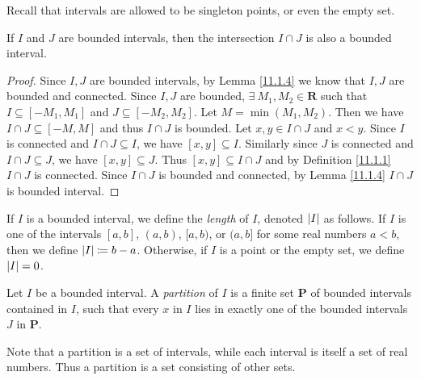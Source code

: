 \begin{remark}\label{11.1.5}
    Recall that intervals are allowed to be singleton points, or even the empty set.
\end{remark}

\begin{corollary}\label{11.1.6}
    If \(I\) and \(J\) are bounded intervals, then the intersection \(I \cap J\) is also a bounded interval.
\end{corollary}

\begin{proof}
    Since \(I, J\) are bounded intervals, by Lemma \ref{11.1.4} we know that \(I, J\) are bounded and connected.
    Since \(I, J\) are bounded, \(\exists\ M_1, M_2 \in \mathbf{R}\) such that \(I \subseteq [-M_1, M_1]\) and \(J \subseteq [-M_2, M_2]\).
    Let \(M = \min(M_1, M_2)\).
    Then we have \(I \cap J \subseteq [-M, M]\) and thus \(I \cap J\) is bounded.
    Let \(x, y \in I \cap J\) and \(x < y\).
    Since \(I\) is connected and \(I \cap J \subseteq I\), we have \([x, y] \subseteq I\).
    Similarly since \(J\) is connected and \(I \cap J \subseteq J\), we have \([x, y] \subseteq J\).
    Thus \([x, y] \subseteq I \cap J\) and by Definition \ref{11.1.1} \(I \cap J\) is connected.
    Since \(I \cap J\) is bounded and connected, by Lemma \ref{11.1.4} \(I \cap J\) is bounded interval.
\end{proof}

\setcounter{theorem}{7}
\begin{definition}\label{11.1.8}
    If \(I\) is a bounded interval, we define the \emph{length} of \(I\), denoted \(\abs*{I}\) as follows.
    If \(I\) is one of the intervals \([a, b]\), \((a, b)\), \([a, b)\), or \((a, b]\) for some real numbers \(a < b\), then we define \(\abs*{I} \coloneqq b - a\).
    Otherwise, if \(I\) is a point or the empty set, we define \(\abs*{I} = 0\).
\end{definition}

\setcounter{theorem}{9}
\begin{definition}[Partitions]\label{11.1.10}
    Let \(I\) be a bounded interval.
    A \emph{partition} of \(I\) is a finite set \(\mathbf{P}\) of bounded intervals contained in \(I\), such that every \(x\) in \(I\) lies in exactly one of the bounded intervals \(J\) in \(\mathbf{P}\).
\end{definition}

\begin{remark}\label{11.1.11}
    Note that a partition is a set of intervals, while each interval is itself a set of real numbers.
    Thus a partition is a set consisting of other sets.
\end{remark}

